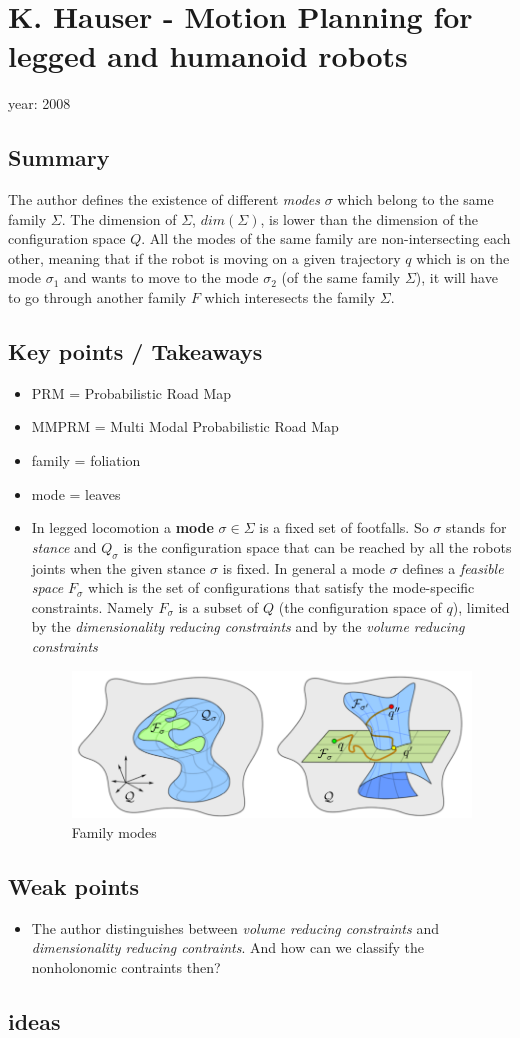 \section{K. Hauser - Motion Planning for legged and humanoid robots \cite{Hauser2008}}
year: 2008
\subsection*{Summary}
The author defines the existence of different \textit{modes} $\sigma$ which belong to the same family $\Sigma$. The dimension of $\Sigma$, $dim(\Sigma)$, is lower than the dimension of the configuration space $Q$. All the modes of the same family are non-intersecting each other, meaning that if the robot is moving on a given trajectory $q$ which is on the mode $\sigma_1$ and wants to move to the mode $\sigma_2$ (of the same family $\Sigma$), it will have to go through another family $F$ which interesects the family $\Sigma$.
\subsection*{Key points / Takeaways}
\begin{itemize}
\item PRM = Probabilistic Road Map
\item MMPRM = Multi Modal Probabilistic Road Map
\item family = foliation
\item mode = leaves
\item In legged locomotion a \textbf{mode} $\sigma \in \Sigma$ is a fixed set of footfalls. So $\sigma$ stands for \textit{stance} and $Q_{\sigma}$ is the configuration space that can be reached by all the robots joints when the given stance $\sigma$ is fixed. In general a mode $\sigma$ defines a \textit{feasible space} $F_{\sigma}$ which is the set of configurations that satisfy the mode-specific constraints. Namely $F_{\sigma}$ is a subset of $Q$ (the configuration space of $q$), limited by the \textit{dimensionality reducing constraints} and by the \textit{volume reducing constraints}
\begin{figure}[h]
  \centering
  \includegraphics[width=120mm]{FamilyModes}
  \caption{Family modes}
  \label{OptimizationDiehl}
\end{figure}
\end{itemize}
\subsection*{Weak points}
\begin{itemize}
\item The author distinguishes between \textit{volume reducing constraints} and \textit{dimensionality reducing contraints}. And how can we classify the nonholonomic contraints then?
\end{itemize}

\subsection*{ideas}